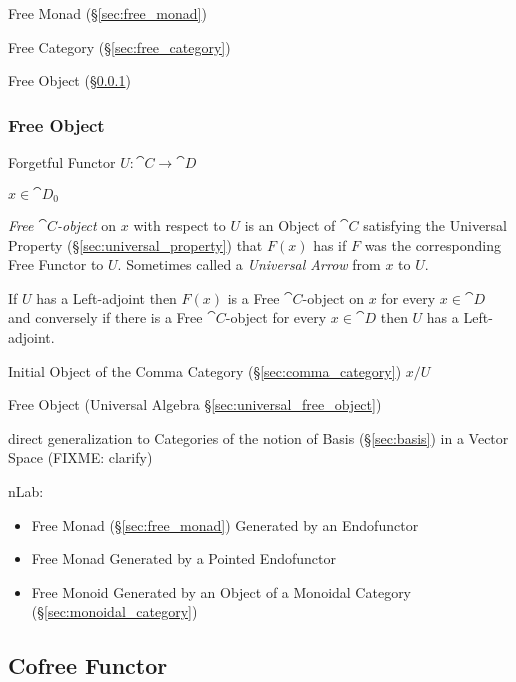 Free Monad (\S\ref{sec:free_monad})

Free Category (\S\ref{sec:free_category})

Free Object (\S\ref{sec:free_object})



\subsubsection{Free Object}\label{sec:free_object}

Forgetful Functor $U : \cat{C} \rightarrow \cat{D}$

$x \in \cat{D}_0$

\emph{Free $\cat{C}$-object} on $x$ with respect to $U$ is an Object
of $\cat{C}$ satisfying the Universal Property
(\S\ref{sec:universal_property}) that $F(x)$ has if $F$ was the
corresponding Free Functor to $U$. Sometimes called a \emph{Universal
  Arrow} from $x$ to $U$.

If $U$ has a Left-adjoint then $F(x)$ is a Free $\cat{C}$-object on
$x$ for every $x \in \cat{D}$ and conversely if there is a Free
$\cat{C}$-object for every $x \in \cat{D}$ then $U$ has a
Left-adjoint.

Initial Object of the Comma Category (\S\ref{sec:comma_category}) $x /
U$

\fist Free Object (Universal Algebra \S\ref{sec:universal_free_object})

direct generalization to Categories of the notion of Basis (\S\ref{sec:basis})
in a Vector Space (FIXME: clarify)

nLab:

\begin{itemize}
  \item Free Monad (\S\ref{sec:free_monad}) Generated by an Endofunctor
  \item Free Monad Generated by a Pointed Endofunctor
  \item Free Monoid Generated by an Object of a Monoidal Category
    (\S\ref{sec:monoidal_category})
\end{itemize}



\subsection{Cofree Functor}\label{sec:cofree_functor}

